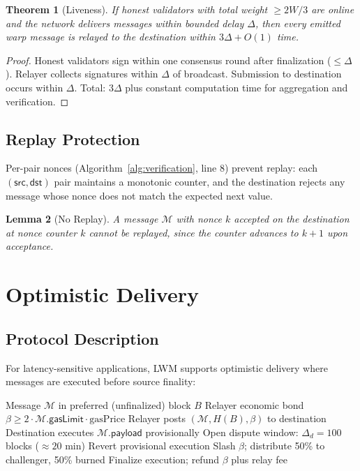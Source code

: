 \documentclass[11pt,a4paper]{article}
\newtheorem{theorem}{Theorem}
\newtheorem{lemma}[theorem]{Lemma}
\begin{document}
\begin{theorem}[Liveness]\label{thm:liveness}
If honest validators with total weight $\geq 2W/3$ are online and the network delivers messages within bounded delay $\Delta$, then every emitted warp message is relayed to the destination within $3\Delta + O(1)$ time.
\end{theorem}

\begin{proof}
Honest validators sign within one consensus round after finalization ($\leq \Delta$). Relayer collects signatures within $\Delta$ of broadcast. Submission to destination occurs within $\Delta$. Total: $3\Delta$ plus constant computation time for aggregation and verification.
\end{proof}

\subsection{Replay Protection}

Per-pair nonces (Algorithm~\ref{alg:verification}, line 8) prevent replay: each $(\mathsf{src}, \mathsf{dst})$ pair maintains a monotonic counter, and the destination rejects any message whose nonce does not match the expected next value.

\begin{lemma}[No Replay]
A message $\mathcal{M}$ with nonce $k$ accepted on the destination at nonce counter $k$ cannot be replayed, since the counter advances to $k+1$ upon acceptance.
\end{lemma}

\section{Optimistic Delivery}\label{sec:optimistic}

\subsection{Protocol Description}

For latency-sensitive applications, LWM supports optimistic delivery where messages are executed before source finality:

\begin{algorithm}[H]
\caption{Optimistic Warp Delivery}
\label{alg:optimistic}
\begin{algorithmic}[1]
\Require Message $\mathcal{M}$ in preferred (unfinalized) block $B$
\Require Relayer economic bond $\beta \geq 2 \cdot \mathcal{M}.\mathsf{gasLimit} \cdot \text{gasPrice}$
\State Relayer posts $(\mathcal{M}, H(B), \beta)$ to destination
\State Destination executes $\mathcal{M}.\mathsf{payload}$ provisionally
\State Open dispute window: $\Delta_d = 100$ blocks ($\approx 20$ min)
    \State Revert provisional execution
    \State Slash $\beta$; distribute 50\% to challenger, 50\% burned
\Else
    \State Finalize execution; refund $\beta$ plus relay fee
\EndIf
\end{algorithmic}
\end{algorithm}
\end{document}
